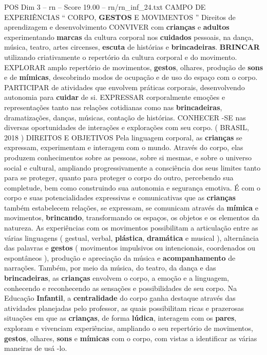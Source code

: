 \begin{textsample}{POS Dim 3 – rn – Score 19.00 – rn/rn\_inf\_24.txt}  \label{ex:f3_pos_100}
CAMPO DE EXPERIÊNCIAS “ CORPO, \textbf{GESTOS} E MOVIMENTOS ” Direitos de aprendizagem e desenvolvimento CONVIVER com \textbf{crianças} e \textbf{adultos} experimentando \textbf{marcas} da cultura corporal nos \textbf{cuidados} pessoais, na dança, música, teatro, artes circenses, \textbf{escuta} de histórias e \textbf{brincadeiras}. \textbf{BRINCAR} utilizando criativamente o repertório da cultura corporal e do movimento.
EXPLORAR amplo repertório de movimentos, \textbf{gestos}, olhares, produção de \textbf{sons} e de \textbf{mímicas}, descobrindo modos de ocupação e de uso do espaço com o corpo.
PARTICIPAR de atividades que envolvem práticas corporais, desenvolvendo autonomia para \textbf{cuidar} de si.
EXPRESSAR corporalmente emoções e representações tanto nas relações cotidianas como nas \textbf{brincadeiras}, dramatizações, danças, músicas, contação de histórias.
CONHECER -SE nas diversas oportunidades de interações e explorações com seu corpo. ( BRASIL, 2018 ) DIREITOS E OBJETIVOS Pela linguagem corporal, as \textbf{crianças} se expressam, experimentam e interagem com o mundo.
Através do corpo, elas produzem conhecimentos sobre as pessoas, sobre si mesmas, e sobre o universo social e cultural, ampliando progressivamente a consciência dos seus limites tanto para se proteger, quanto para proteger o corpo do outro, percebendo sua completude, bem como construindo sua autonomia e segurança emotiva.
É com o corpo e suas potencialidades expressivas e comunicativas que as \textbf{crianças} também estabelecem relações, se expressam, se comunicam através da \textbf{mímica} e movimentos, \textbf{brincando}, transformando os espaços, os objetos e os elementos da natureza.
As experiências com os movimentos possibilitam a articulação entre as várias linguagens ( gestual, verbal, \textbf{plástica}, \textbf{dramática} e musical ), alternância das palavras e \textbf{gestos} ( movimentos impulsivos ou intencionais, coordenados ou espontâneos ), produção e apreciação da música e \textbf{acompanhamento} de narrações.
Também, por meio da música, do teatro, da dança e das \textbf{brincadeiras}, as \textbf{crianças} envolvem o corpo, a emoção e a linguagem, conhecendo e reconhecendo as sensações e possibilidades de seu corpo.
Na Educação \textbf{Infantil}, a \textbf{centralidade} do corpo ganha destaque através das atividades planejadas pelo professor, as quais possibilitam ricas e prazerosas situações em que as \textbf{crianças}, de forma \textbf{lúdica}, interagem com os \textbf{pares}, exploram e vivenciam experiências, ampliando o seu repertório de movimentos, \textbf{gestos}, olhares, \textbf{sons} e \textbf{mímicas} com o corpo, com vistas a identificar as várias maneiras de usá -lo.

\end{textsample}
